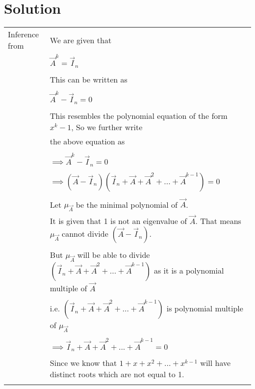 \documentclass[journal,12pt]{IEEEtran}
\begin{document}
	\section{\textbf{Solution}}
	\begin{longtable}{|l|l|}
		\hline
		\multirow{3}{*}{Inference from }   
		& \\ 
		& We are given that \\the Given Data
		& \\
		& \qquad \qquad \qquad$\vec{A}^k = \vec{I}_n$ \\
		& \\
		& This can be written as \\
		& \\
		& \qquad \qquad \qquad$\vec{A}^k - \vec{I}_n = 0$ \\
		& \\
		& This resembles the polynomial equation of the form $x^{k}-1$, So we further write \\
		& the above equation as \\
		& \\
		& \qquad \qquad $\implies \vec{A}^k - \vec{I}_n = 0$ \\
		& \\
		& \qquad \qquad $\implies (\vec{A} - \vec{I}_n)(\vec{I}_n + \vec{A} + \vec{A}^2 + ... + \vec{A}^{k-1}) = 0$ \\
		& \\
		& Let $\mu_{\vec{A}}$ be the minimal polynomial of $\vec{A}$. \\
		& It is given that 1 is not an eigenvalue of $\vec{A}$. That means $\mu_{\vec{A}}$ cannot divide $(\vec{A} - \vec{I}_n)$.\\
		& \\
		& But $\mu_{\vec{A}}$ will be able to divide  $(\vec{I}_n + \vec{A} + \vec{A}^2 + ... + \vec{A}^{k-1})$ as it is a polynomial multiple of $\vec{A}$\\ 
		& \\
		& i.e. $(\vec{I}_n + \vec{A} + \vec{A}^2 + ... + \vec{A}^{k-1})$ is polynomial multiple of $\mu_{\vec{A}}$ \\
		& \\
		& \qquad \qquad  $\implies \vec{I}_n + \vec{A} + \vec{A}^2 + ... + \vec{A}^{k-1} = 0$ \\
		& \\
		& Since we know that $1 + x + x^2 + ... + x^{k-1}$ will have distinct roots which are not equal to 1. \\
		& \\
		\hline

\end{longtable}
\end{document}
